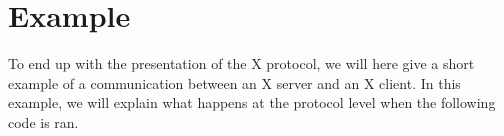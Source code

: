 \section{Example}
To end up with the presentation of the X protocol, we will here give a
short example of a communication between an X server and an X client. 
In this example, we will explain what happens at the protocol level 
when the following code is ran.
%

%